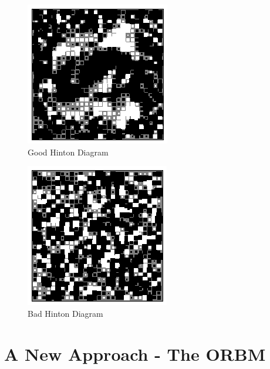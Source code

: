     \begin{figure}[]
    \begin{center}
    	\includegraphics[]{Assets/HINTON1}
    \caption{ Good Hinton Diagram}
    \label{F:TEMP}
    \end{center}
    \end{figure}
    \begin{figure}[]
    \begin{center}
      \includegraphics[]{Assets/HINTON2}
    \caption{Bad Hinton Diagram}
    \label{F:TEMP}
    \end{center}
    \end{figure}


    \section{A New Approach - The ORBM}

